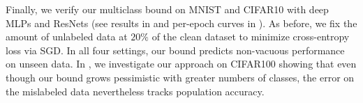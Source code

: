 Finally, we verify our multiclass bound
on MNIST and CIFAR10
with deep MLPs and ResNets
(see results in 
and per-epoch curves in ). 
As before, 
we fix the amount of unlabeled data 
at $20\%$ of the clean dataset 
to minimize cross-entropy loss via SGD.
In all four settings, our bound predicts 
non-vacuous performance on unseen data. 
In , we investigate 
our approach on CIFAR100 
showing that even though 
our bound grows pessimistic 
with greater numbers of classes, 
the error on the mislabeled data nevertheless tracks population accuracy. 
% 



